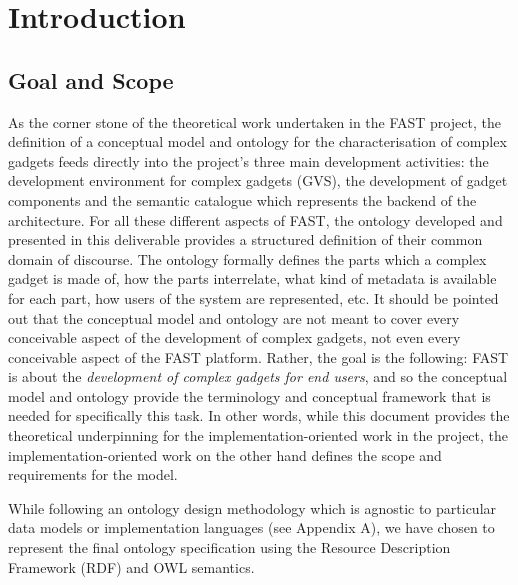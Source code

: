 \documentclass[twoside]{fast_latex}
\begin{document}
\listoftables
\listoffigures
\lstlistoflistings

\cleardoublepage

\clearpage

\section{Introduction} %
\label{sec:introduction}

\subsection{Goal and Scope} %
\label{sub:goal_and_scope}

As the corner stone of the theoretical work undertaken in the FAST project, the definition of a conceptual model and ontology for the characterisation of complex gadgets feeds directly into the project's three main development activities: the development environment for complex gadgets (GVS), the development of gadget components and the semantic catalogue which represents the backend of the architecture. For all these different aspects of FAST, the ontology developed and presented in this deliverable provides a structured definition of their common domain of discourse. The ontology formally defines the parts which a complex gadget is made of, how the parts interrelate, what kind of metadata is available for each part, how users of the system are represented, etc. It should be pointed out that the conceptual model and ontology are not meant to cover every conceivable aspect of the development of complex gadgets, not even every conceivable aspect of the FAST platform. Rather, the goal is the following: FAST is about the \emph{development of complex gadgets for end users}, and so the conceptual model and ontology provide the terminology and conceptual framework that is needed for specifically this task. In other words, while this document provides the theoretical underpinning for the implementation-oriented work in the project, the implementation-oriented work on the other hand defines the scope and requirements for the model.

While following an ontology design methodology which is agnostic to particular data models or implementation languages (see Appendix A), we have chosen to represent the final ontology specification using the Resource Description Framework (RDF) and OWL semantics.
\end{document}

